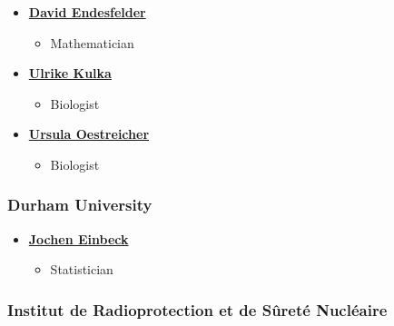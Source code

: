 \documentclass[]{scrartcl}
\providecommand{\tightlist}{%
  \setlength{\itemsep}{0pt}\setlength{\parskip}{0pt}}
\begin{document}
\begin{itemize}
\tightlist
\item
  \textbf{\href{https://www.researchgate.net/profile/David_Endesfelder2}{David Endesfelder}}

  \begin{itemize}
  \tightlist
  \item
    Mathematician
  \end{itemize}
\item
  \textbf{\href{https://www.researchgate.net/profile/Ulrike_Kulka}{Ulrike Kulka}}

  \begin{itemize}
  \tightlist
  \item
    Biologist
  \end{itemize}
\item
  \textbf{\href{https://www.researchgate.net/scientific-contributions/2121336457_Ursula_Oestreicher}{Ursula Oestreicher}}

  \begin{itemize}
  \tightlist
  \item
    Biologist
  \end{itemize}
\end{itemize}

\hypertarget{durham-university}{%
\subsubsection*{Durham University}\label{durham-university}}

\begin{itemize}
\tightlist
\item
  \textbf{\href{https://www.dur.ac.uk/research/directory/staff/?id=4542}{Jochen Einbeck}}

  \begin{itemize}
  \tightlist
  \item
    Statistician
  \end{itemize}
\end{itemize}

\hypertarget{institut-de-radioprotection-et-de-surete-nucleaire}{%
\subsubsection*{Institut de Radioprotection et de Sûreté Nucléaire}\label{institut-de-radioprotection-et-de-surete-nucleaire}}
\end{document}
